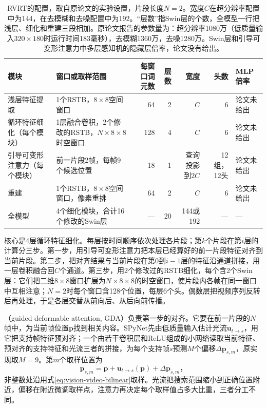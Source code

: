 \begin{table}[tbp]
  \centering
  \small
  \begin{tabularx}{\linewidth}{@{}lXrrrrl@{}}
    \toprule
    模块 & 窗口或取样范围 & 每窗口词元数 & 层数 & 宽度 & 头数 & MLP倍率\\
    \midrule
    浅层特征提取 & 1个RSTB，$8\times8$空间窗口 & 64 & 2 & $C$ & 6 & 论文未给出\\
    循环特征细化（每个模块） & 1层融合卷积，2个修改的RSTB，$N\times8\times8$时空窗口 & 128 & 4 & $C$ & 6 & 论文未给出\\
    引导可变形注意力（每个模块） & 前一片段2帧，每帧9个候选位置 & 18 & 1 & 查询投影到$2C$ & 12组，12头 & 论文未给出\\
    重建 & 1个RSTB，$8\times8$空间窗口，像素重排 & 64 & 2 & $C$ & 6 & 论文未给出\\
    \midrule
    全模型 & 4个细化模块，合计16个修改的Swin层 & — & 20 & 144或192 & — & —\\
    \bottomrule
  \end{tabularx}
  \caption{RVRT的配置，取自原论文的实验设置，片段长度$N=2$。宽度$C$在超分辨率配置中为144，在去模糊和去噪配置中为192。“层数”指Swin层的个数，全模型一行把浅层、细化和重建三段相加。原论文报告的参数量为：超分辨率1080万（低质量输入$320\times180$时运行时间183毫秒），去模糊1360万，去噪1280万。Swin层和引导可变形注意力中多层感知机的隐藏层倍率，论文没有给出。}
  \label{tab:vision-video-rvrt-config}
\end{table}

核心是4层循环特征细化。每层按时间顺序依次处理各片段；第$k$个片段在第$i$层的计算分三步。第一步，用引导可变形注意力把本层已经算好的前一片段特征对齐到当前片段。第二步，把对齐结果与当前片段在第$0$到$i-1$层的特征沿通道拼接，用一层卷积融合回$C$个通道。第三步，用2个修改过的RSTB细化，每个含2个Swin层：它们把二维$8\times8$窗口扩展为$N\times8\times8$的时空窗口，使片段内各帧在同一窗口中互相注意；$N=2$时每个窗口含128个位置，每层6个头。偶数层把视频序列反转后再处理，于是各层交替从前向后、从后向前传播。

（guided deformable attention, GDA）负责第一步的对齐。它要在前一片段的$N$帧中，为当前帧位置$\bm{p}$找到相关内容。SPyNet先由低质量输入估计光流$\bm{u}_{t\to s}$，用它把支持帧特征预对齐；一个由若干卷积层和ReLU组成的小网络读取当前特征、预对齐的支持特征和光流三者的拼接，为每个支持帧$s$预测$M$个偏移$\Delta\bm{p}_{s,m}$，原实现取$M=9$。第$m$个取样位置为
\[
  \bm{p}_{s,m}=\bm{p}+\bm{u}_{t\to s}(\bm{p})
                   +\Delta\bm{p}_{s,m}\text{，}
\]
非整数处沿用式\eqref{eq:vision-video-bilinear}取样。光流把搜索范围缩小到正确位置附近，偏移在附近微调取样点，注意力再决定每个取样值占多大比重，三者分工不同。

